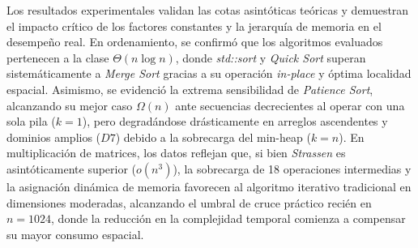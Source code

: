 Los resultados experimentales validan las cotas asintóticas teóricas y demuestran el impacto crítico de los factores constantes y la jerarquía de memoria en el desempeño real. En ordenamiento, se confirmó que los algoritmos evaluados pertenecen a la clase $\Theta(n \log n)$, donde \textit{std::sort} y \textit{Quick Sort} superan sistemáticamente a \textit{Merge Sort} gracias a su operación \textit{in-place} y óptima localidad espacial. Asimismo, se evidenció la extrema sensibilidad de \textit{Patience Sort}, alcanzando su mejor caso $\Omega(n)$ ante secuencias decrecientes al operar con una sola pila ($k=1$), pero degradándose drásticamente en arreglos ascendentes y dominios amplios ($D7$) debido a la sobrecarga del min-heap ($k=n$). En multiplicación de matrices, los datos reflejan que, si bien \textit{Strassen} es asintóticamente superior ($o(n^3)$), la sobrecarga de 18 operaciones intermedias y la asignación dinámica de memoria favorecen al algoritmo iterativo tradicional en dimensiones moderadas, alcanzando el umbral de cruce práctico recién en $n = 1024$, donde la reducción en la complejidad temporal comienza a compensar su mayor consumo espacial.